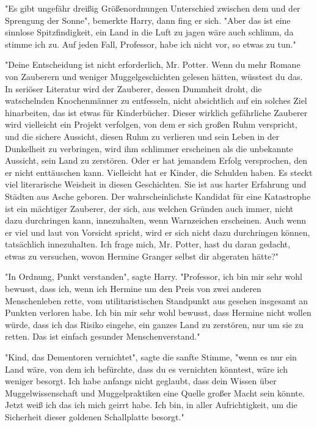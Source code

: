 {"Es gibt ungefähr dreißig Größenordnungen Unterschied zwischen dem und der Sprengung der Sonne", bemerkte Harry, dann fing er sich. "Aber das ist eine sinnlose Spitzfindigkeit, ein Land in die Luft zu jagen wäre auch schlimm, da stimme ich zu. Auf jeden Fall, Professor, habe ich nicht vor, so etwas zu tun."

"Deine Entscheidung ist nicht erforderlich, Mr. Potter. Wenn du mehr Romane von Zauberern und weniger Muggelgeschichten gelesen hätten, wüsstest du das. In seriöser Literatur wird der Zauberer, dessen Dummheit droht, die watschelnden Knochenmänner zu entfesseln, nicht absichtlich auf ein solches Ziel hinarbeiten, das ist etwas für Kinderbücher. Dieser wirklich gefährliche Zauberer wird vielleicht ein Projekt verfolgen, von dem er sich großen Ruhm verspricht, und die sichere Aussicht, diesen Ruhm zu verlieren und sein Leben in der Dunkelheit zu verbringen, wird ihm schlimmer erscheinen als die unbekannte Aussicht, sein Land zu zerstören. Oder er hat jemandem Erfolg versprochen, den er nicht enttäuschen kann. Vielleicht hat er Kinder, die Schulden haben. Es steckt viel literarische Weisheit in diesen Geschichten. Sie ist aus harter Erfahrung und Städten aus Asche geboren. Der wahrscheinlichste Kandidat für eine Katastrophe ist ein mächtiger Zauberer, der sich, aus welchen Gründen auch immer, nicht dazu durchringen kann, innezuhalten, wenn Warnzeichen erscheinen. Auch wenn er viel und laut von Vorsicht spricht, wird er sich nicht dazu durchringen können, tatsächlich innezuhalten. Ich frage mich, Mr. Potter, hast du daran gedacht, etwas zu versuchen, wovon Hermine Granger selbst dir abgeraten hätte?"

"In Ordnung, Punkt verstanden", sagte Harry. "Professor, ich bin mir sehr wohl bewusst, dass ich, wenn ich Hermine um den Preis von zwei anderen Menschenleben rette, vom utilitaristischen Standpunkt aus gesehen insgesamt an Punkten verloren habe. Ich bin mir sehr wohl bewusst, dass Hermine nicht wollen würde, dass ich das Risiko eingehe, ein ganzes Land zu zerstören, nur um sie zu retten. Das ist einfach gesunder Menschenverstand."

"Kind, das Dementoren vernichtet", sagte die sanfte Stimme, "wenn es nur ein Land wäre, von dem ich befürchte, dass du es vernichten könntest, wäre ich weniger besorgt. Ich habe anfangs nicht geglaubt, dass dein Wissen über Muggelwissenschaft und Muggelpraktiken eine Quelle großer Macht sein könnte. Jetzt weiß ich das ich mich geirrt habe. Ich bin, in aller Aufrichtigkeit, um die Sicherheit dieser goldenen Schallplatte besorgt."

}
